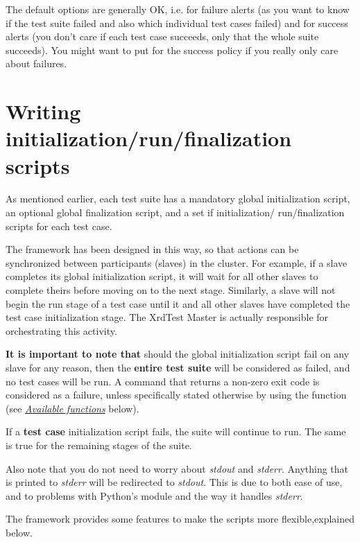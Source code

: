 \documentclass[letterpaper,10pt,english]{sphinxmanual}
\begin{document}
The default options are generally OK, i.e.  for failure alerts (as you
want to know if the test suite failed and also which individual test cases failed)
and  for success alerts (you don't care if each test case succeeds, only
that the whole suite succeeds). You might want to put  for the success
policy if you really only care about failures.


\section{Writing initialization/run/finalization scripts}
\label{testsuites:writing-initialization-run-finalization-scripts}\label{testsuites:scripts}
As mentioned earlier, each test suite has a mandatory global initialization
script, an optional global finalization script, and a set if initialization/
run/finalization scripts for each test case.

The framework has been designed in this way, so that actions can be synchronized
between participants (slaves) in the cluster. For example, if a slave completes
its global initialization script, it will wait for all other slaves to complete
theirs before moving on to the next stage. Similarly, a slave will not begin the
run stage of a test case until it and all other slaves have completed the test
case initialization stage. The XrdTest Master is actually responsible for
orchestrating this activity.

\textbf{It is important to note that} should the global initialization script fail
on any slave for any reason, then the \textbf{entire test suite} will be considered
as failed, and no test cases will be run. A command that returns a non-zero
exit code is considered as a failure, unless specifically stated otherwise by
using the  function (see {\hyperref[testsuites:functions]{\emph{Available functions}}} below).

If a \textbf{test case} initialization script fails, the suite will continue to run.
The same is true for the remaining stages of the suite.

Also note that you do not need to worry about \emph{stdout} and \emph{stderr}. Anything
that is printed to \emph{stderr} will be redirected to \emph{stdout}. This is due to
both ease of use, and to problems with Python's  module and the
way it handles \emph{stderr}.

The framework provides some features to make the scripts more flexible,explained
below.
\end{document}
